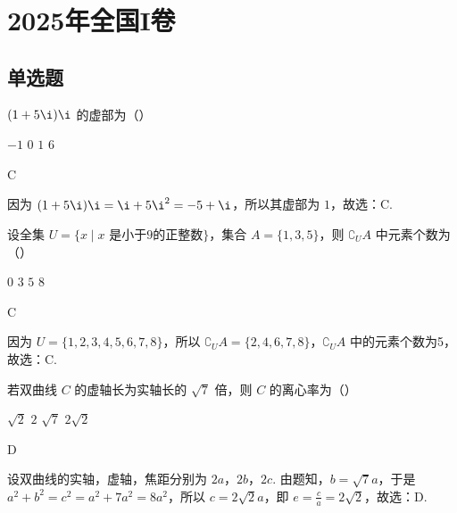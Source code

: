 \documentclass[UTF8,a4paper,oneside,11pt]{ctexbook}
\begin{document}
\mainmatter

\chapter{2025年全国I卷}

\section{单选题}

\begin{problem}
\((1+5\i)\i\) 的虚部为（\quad）

\choices
    {\(-1\)}
    {\(0\)}
    {\(1\)}
    {\(6\)}
\end{problem}

\begin{answer}
C
\end{answer}

\begin{solution}
因为 \((1+5\i)\i=\i+5\i^2=-5+\i\)，所以其虚部为 \(1\)，故选：C.
\end{solution}

\begin{problem}
设全集 \(U=\{x \mid x \text{ 是小于9的正整数}\}\)，集合 \(A=\{1,3,5\}\)，则 \(\complement_U A\) 中元素个数为（\quad）

\choices
    {\(0\)}
    {\(3\)}
    {\(5\)}
    {\(8\)}
\end{problem}

\begin{answer}
C
\end{answer}

\begin{solution}
因为 \(U=\{1,2,3,4,5,6,7,8\}\)，所以 \(\complement_U A=\{2,4,6,7,8\}\)，\(\complement_U A\) 中的元素个数为5，故选：C.
\end{solution}

\begin{problem}
若双曲线 \(C\) 的虚轴长为实轴长的 \(\sqrt{7}\) 倍，则 \(C\) 的离心率为（\quad）

\choices
    {\(\sqrt{2}\)}
    {\(2\)}
    {\(\sqrt{7}\)}
    {\(2\sqrt{2}\)}
\end{problem}

\begin{answer}
D
\end{answer}

\begin{solution}
设双曲线的实轴，虚轴，焦距分别为 \(2a\)，\(2b\)，\(2c\). 由题知，\(b = \sqrt{7}a\)，于是
\(a^2+b^2=c^2=a^2+7a^2=8a^2\)，所以 \(c = 2\sqrt{2}a\)，即 \(e=\frac{c}{a}=2\sqrt{2}\)，故选：D.
\end{solution}
\end{document}
